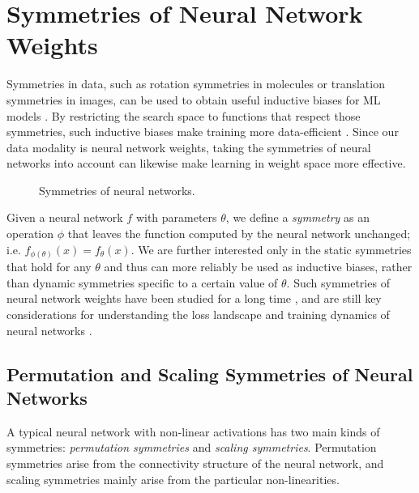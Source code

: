 
\chapter{Symmetries of Neural Network Weights}\label{section:geometry_of_nns}

Symmetries in data, such as rotation symmetries in molecules or translation symmetries in images, can be used to obtain useful inductive biases for ML models \citep{bronsteinGeometricDeepLearning2021,weilerEquivariantCoordinateIndependent2023}. By restricting the search space to functions that respect those symmetries, such inductive biases make training more data-efficient \citep{brehmerDoesEquivarianceMatter2024}. Since our data modality is neural network weights, taking the symmetries of neural networks into account can likewise make learning in weight space more effective. 

\begin{figure}[t!]
    \caption{\label{fig:nn_sym} Symmetries of neural networks.}    
\end{figure}

Given a neural network $f$ with parameters $\theta$, we define a \textit{symmetry} as an operation $\phi$ that leaves the function computed by the neural network unchanged; i.e. $f_{\phi(\theta)}(x) = f_\theta(x)$. We are further interested only in the static symmetries that hold for any $\theta$ and thus can more reliably be used as inductive biases, rather than dynamic symmetries specific to a certain value of $\theta$. Such symmetries of neural network weights have been studied for a long time \citep{hecht-nielsenALGEBRAICSTRUCTUREFEEDFORWARD1990}, and are still key considerations for understanding the loss landscape and training dynamics of neural networks \citep{breaWeightspaceSymmetryDeep2019a,simsekGeometryLossLandscape2021,limEmpiricalImpactNeural2024,zhaoIMPROVINGCONVERGENCEGENERALIZATION2024}.

\section{Permutation and Scaling Symmetries of Neural Networks} \label{sec:perm_and_scale_sym}

A typical neural network with non-linear activations has two main kinds of symmetries: \textit{permutation symmetries} and \textit{scaling symmetries}. Permutation symmetries arise from the connectivity structure of the neural network, and scaling symmetries mainly arise from the particular non-linearities. 

